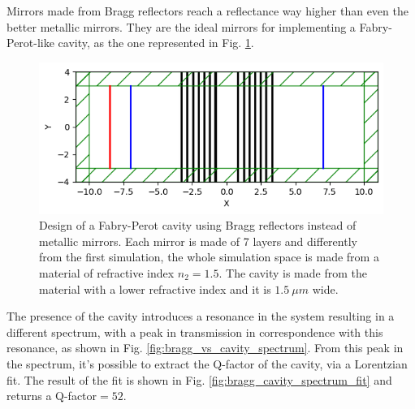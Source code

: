 Mirrors made from Bragg reflectors reach a reflectance way higher than even the better metallic mirrors. They are the ideal mirrors for implementing a Fabry-Perot-like cavity, as the one represented in Fig. \ref{fig:bragg_cavity_design}.

\begin{figure}[H]
    \centering
    \includegraphics[width=0.8\linewidth]{Figures/bragg_cavity_design.png}
    \caption{Design of a Fabry-Perot cavity using Bragg reflectors instead of metallic mirrors. Each mirror is made of 7 layers and differently from the first simulation, the whole simulation space is made from a material of refractive index \(n_2 = 1.5\). The cavity is made from the material with a lower refractive index and it is \(1.5\ \mu m\) wide.}
    \label{fig:bragg_cavity_design}
\end{figure}

The presence of the cavity introduces a resonance in the system resulting in a different spectrum, with a peak in transmission in correspondence with this resonance, as shown in Fig. \ref{fig:bragg_vs_cavity_spectrum}. From this peak in the spectrum, it's possible to extract the Q-factor of the cavity, via a Lorentzian fit. The result of the fit is shown in Fig. \ref{fig:bragg_cavity_spectrum_fit} and returns a Q-factor\(=52\).

